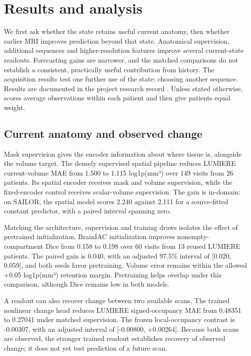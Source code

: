 \clearpage
\chapter{Results and analysis}\label{ch:results}
\begingroup
{}
\makeatletter{}\makeatother
{}

We first ask whether the state retains useful current anatomy, then whether earlier MRI improves prediction beyond that state. Anatomical supervision, additional sequences and higher-resolution features improve several current-state readouts. Forecasting gains are narrower, and the matched comparisons do not establish a consistent, practically useful contribution from history. The acquisition results test one further use of the state: choosing another sequence. Results are documented in the project research record \cite{record}. Unless stated otherwise, scores average observations within each patient and then give patients equal weight.

\section{Current anatomy and observed change}

Mask supervision gives the encoder information about where tissue is, alongside the volume target. The densely supervised spatial pipeline reduces LUMIERE current-volume MAE from 1.500 to 1.115 log1p(mm³) over 149 visits from 26 patients. Its spatial encoder receives mask and volume supervision, while the fixed-encoder control receives scalar-volume supervision. The gain is in-domain: on SAILOR, the spatial model scores 2.240 against 2.111 for a source-fitted constant predictor, with a paired interval spanning zero.

Matching the architecture, supervision and training draws isolates the effect of pretrained initialization. BrainIAC initialization improves nonempty-compartment Dice from 0.158 to 0.198 over 60 visits from 13 reused LUMIERE patients. The paired gain is 0.040, with an adjusted 97.5\% interval of [0.020, 0.059], and both seeds favor pretraining. Volume error remains within the allowed +0.05 log1p(mm³) retention margin. Pretraining helps overlap under this comparison, although Dice remains low in both models.

A readout can also recover change between two available scans. The trained nonlinear change head reduces LUMIERE signed-occupancy MAE from 0.48351 to 0.27041 under matched supervision. The frozen local-occupancy contrast is -0.00307, with an adjusted interval of [-0.00800, +0.00264]. Because both scans are observed, the stronger trained readout establishes recovery of observed change; it does not yet test prediction of a future scan.

